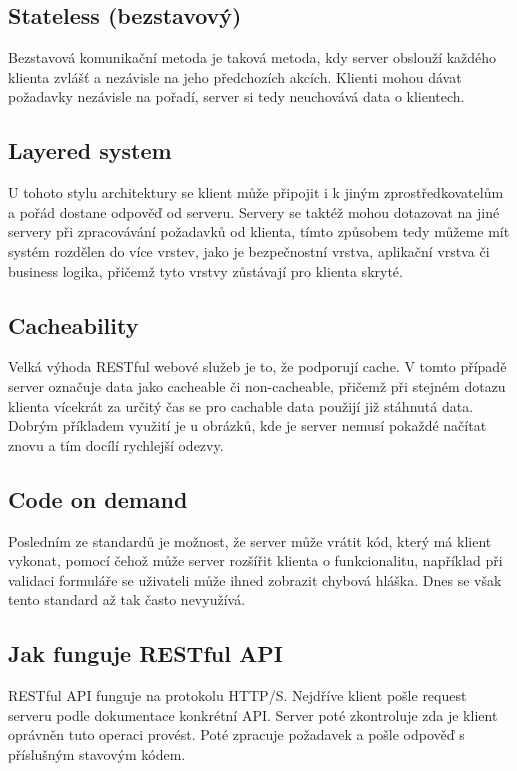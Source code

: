 \subsection{Stateless (bezstavový)}
Bezstavová komunikační metoda je taková metoda, kdy server obslouží každého klienta zvlášť a nezávisle na jeho předchozích akcích. Klienti mohou dávat požadavky nezávisle na pořadí, server si tedy neuchovává data o klientech.

\subsection{Layered system}
U tohoto stylu architektury se klient může připojit i k jiným zprostředkovatelům a pořád dostane odpověď od serveru. Servery se taktéž mohou dotazovat na jiné servery při zpracovávání požadavků od klienta, tímto způsobem tedy můžeme mít systém rozdělen do více vrstev, jako je bezpečnostní vrstva, aplikační vrstva či business logika, přičemž tyto vrstvy zůstávají pro klienta skryté.

\subsection{Cacheability}
Velká výhoda RESTful webové služeb je to, že podporují cache. V tomto případě server označuje data jako cacheable či non-cacheable, přičemž při stejném dotazu klienta vícekrát za určitý čas se pro cachable data použijí již stáhnutá data. Dobrým příkladem využití je u obrázků, kde je server nemusí pokaždé načítat znovu a tím docílí rychlejší odezvy.

\subsection{Code on demand}
Posledním ze standardů je možnost, že server může vrátit kód, který má klient vykonat, pomocí čehož může server rozšířit klienta o funkcionalitu, například při validaci formuláře se uživateli může ihned zobrazit chybová hláška. Dnes se však tento standard až tak často nevyužívá.


\subsection{Jak funguje RESTful API} %
RESTful API funguje na protokolu HTTP/S. Nejdříve klient pošle request serveru podle dokumentace konkrétní API. Server poté zkontroluje zda je klient oprávněn tuto operaci provést. Poté zpracuje požadavek a pošle odpověď s příslušným stavovým kódem.

